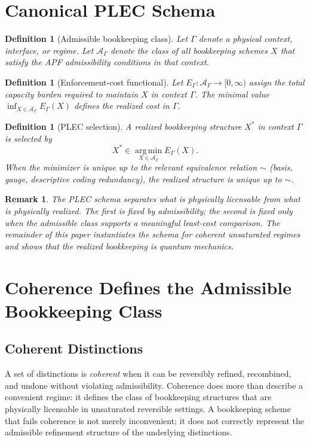 \documentclass[11pt]{article}
\newtheorem{definition}[theorem]{Definition}
\newtheorem{remark}[theorem]{Remark}
\begin{document}
\section{Canonical PLEC Schema}\label{sec:plec}

\begin{definition}[Admissible bookkeeping class]
Let $\Gamma$ denote a physical context, interface, or regime. Let $\mathcal{A}_{\Gamma}$
denote the class of all bookkeeping schemes $X$ that satisfy the APF admissibility
conditions in that context.
\end{definition}

\begin{definition}[Enforcement-cost functional]
Let $E_{\Gamma} : \mathcal{A}_{\Gamma} \to [0,\infty)$ assign the total capacity
burden required to maintain $X$ in context $\Gamma$. The minimal value
$\inf_{X \in \mathcal{A}_{\Gamma}} E_{\Gamma}(X)$ defines the realized cost in
$\Gamma$.
\end{definition}

\begin{definition}[PLEC selection]
A realized bookkeeping structure $X^{\ast}$ in context $\Gamma$ is selected by
\[
X^{\ast} \in \operatorname*{arg\,min}_{X \in \mathcal{A}_{\Gamma}} E_{\Gamma}(X).
\]
When the minimizer is unique up to the relevant equivalence relation $\sim$ (basis,
gauge, descriptive coding redundancy), the realized structure is unique up to
$\sim$.
\end{definition}

\begin{remark}
The PLEC schema separates what is \emph{physically licensable} from what is
\emph{physically realized}. The first is fixed by admissibility; the second is
fixed only when the admissible class supports a meaningful least-cost comparison.
The remainder of this paper instantiates the schema for coherent unsaturated
regimes and shows that the realized bookkeeping is quantum mechanics.
\end{remark}

\section{Coherence Defines the Admissible Bookkeeping Class}\label{sec:linear}

\subsection{Coherent Distinctions}
A set of distinctions is \emph{coherent} when it can be reversibly refined,
recombined, and undone without violating admissibility. Coherence does more than
describe a convenient regime: it defines the class of bookkeeping structures that
are physically licensable in unsaturated reversible settings. A bookkeeping scheme
that fails coherence is not merely inconvenient; it does not correctly represent
the admissible refinement structure of the underlying distinctions.
\end{document}
